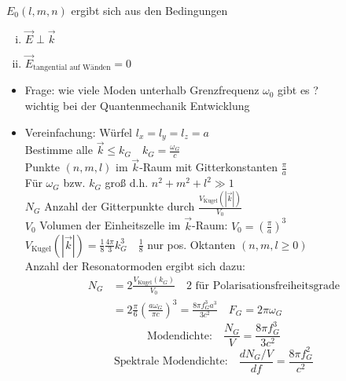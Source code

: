 \documentclass[titlepage,12pt,a4paper,ngerman]{report}
\newcommand{\tx}[1]{\textrm{#1}}
\begin{document}
$ E_0(l,m,n) $ ergibt sich aus den Bedingungen
\begin{enumerate}[i)]
	\item $ \vec{E} \perp \vec{k} $ 
	\item $ \vec{E}_{\tx{tangential auf Wänden}} = 0  $
\end{enumerate}
\begin{itemize}
	\item Frage: wie viele Moden unterhalb Grenzfrequenz $ \omega_0 $ gibt es ?\\
	wichtig bei der Quantenmechanik Entwicklung 
	\item[] Vereinfachung: Würfel $ l_x = l_y = l_z = a $\\
	Bestimme alle $ \vec{k} \le k_G \quad k_G = \frac{\omega_G}{c} $\\
	Punkte $ (n,m,l) $ im $ \vec{k} $-Raum mit Gitterkonstanten $ \frac{\pi}{a} $\\
	Für $ \omega_G $ bzw. $ k_G $ groß d.h. $ n^2 + m^2 + l^2 \gg 1 $\\
	$ N_G $ Anzahl der Gitterpunkte durch $ \frac{V_{\tx{Kugel}}(|\vec{k}|)}{V_0} $\\
	$ V_0 $ Volumen der Einheitszelle im $ \vec{k} $-Raum: $ V_0 = (\frac{\pi}{a})^3 $\\
	$ V_{\tx{Kugel}}(|\vec{k}|) = \frac{1}{8} \frac{4\pi}{3} k_G^3 \quad \frac{1}{8} $ nur pos. Oktanten $ (n,m,l \ge 0) $\\
	Anzahl der Resonatormoden ergibt sich dazu:
	\begin{align*}
	N_G &= 2 \frac{V_{\tx{Kugel}} (k_G) }{V_0} \quad 2 \tx{ für Polarisationsfreiheitsgrade}\\
	&= 2 \frac{\pi}{6} (\frac{a\omega_G}{\pi c}) ^3 = \frac{8 \pi f_{G}^3 a^3}{3 c^2} \quad F_G = 2 \pi \omega_G
	\end{align*}
	$$\tx{Modendichte:}\quad \frac{N_G}{V} = \frac{ 8 \pi f_G^3}{3 c^2}$$
	$$\tx{Spektrale Modendichte:} \quad \frac{d N_G/V}{df} = \frac{8 \pi f_G^2}{c^2}$$
\end{itemize}
\end{document}
